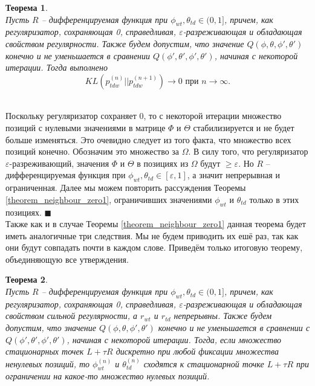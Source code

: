 \documentclass[12pt]{article}
\newtheorem{theorem}{Теорема}
\newenvironment{Proof} 
	{\par\noindent{\bf Доказательство.}} 
	{\hfill$\blacksquare$}
\renewcommand{\geq}{\geqslant}
\begin{document}
\begin{theorem} \label{theorem_neighbour_zero2} \ \\
	Пусть $R$ -- дифференцируемая функция при $\phi_{wt}, \theta_{td} \in (0, 1]$, причем, как регуляризатор, сохраняющая 0, справедливая, $\varepsilon$-разреживающая и обладающая свойством регулярности. Также будем допустим,  что значение $Q(\phi, \theta, \phi', \theta')$ конечно и не уменьшается в сравнении $Q(\phi', \theta', \phi', \theta')$, начиная с некоторой итерации. Тогда выполнено
\[
KL(p_{tdw}^{(n)}||p_{tdw}^{(n + 1)}) \to 0 \text{ при } n \to \infty.
\]
\end{theorem}
\begin{Proof}\ \\
Поскольку регуляризатор сохраняет 0, то с некоторой итерации множество позиций с нулевыми значениями в матрице $\Phi$ и $\Theta$ стабилизируется и не будет больше изменяться. Это очевидно следует из того факта, что  множество всех позиций конечно. Обозначим это множество за $\Omega$. В силу того, что регуляризатор $\varepsilon$-разреживающий, значения $\Phi$ и $\Theta$ в позициях из $\Omega$ будут $\geq \varepsilon$. Но $R$ -- дифференцируемая функция при $\phi_{wt}, \theta_{td} \in [\varepsilon, 1]$, а значит непрерывная и ограниченная. Далее мы можем повторить рассуждения Теоремы \ref{theorem_neighbour_zero1}, ограничивших значениями $\phi_{wt}$ и $\theta_{td}$ только в этих позициях. 
\end{Proof}\ \\
Также как и в случае Теоремы \ref{theorem_neighbour_zero1} данная теорема будет иметь аналогичные три следствия. Мы не будем приводить их ешё раз, так как они будут совпадать почти в каждом слове. Приведём только итоговую теорему, объединяющую все утверждения.
\begin{theorem} \label{theorem_convergence1} \ \\
	Пусть $R$ -- дифференцируемая функция при $\phi_{wt}, \theta_{td} \in (0, 1]$, причем, как регуляризатор, сохраняющая 0, справедливая, $\varepsilon$-разреживающая и обладающая свойством сильной регулярности, а  $r_{wt}$ и $r_{td}$ непрерывны. Также будем допустим,  что значение $Q(\phi, \theta, \phi', \theta')$ конечно и не уменьшается в сравнении с $Q(\phi', \theta', \phi', \theta')$, начиная с некоторой итерации. Тогда, если множество стационарных точек $L + \tau R$ дискретно при любой фиксации множества ненулевых позиций, то $\phi_{wt}^{(n)}$ и $\theta_{td}^{(n)}$ сходятся к стационарной точке $L + \tau R$ при ограничении на какое-то множество нулевых позиций.
\end{theorem}
\end{document}
